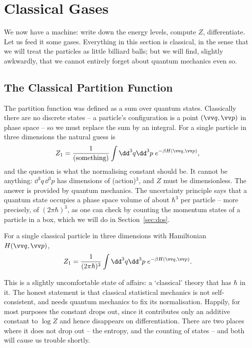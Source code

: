 \section{Classical Gases}

We now have a machine: write down the energy levels, compute $Z$, differentiate. Let us feed it some gases. Everything in this section is classical, in the sense that we will treat the particles as little billiard balls; but we will find, slightly awkwardly, that we cannot entirely forget about quantum mechanics even so.

\subsection{The Classical Partition Function}\label{sec:classicalZ}

The partition function was defined as a sum over quantum states. Classically there are no discrete states -- a particle's configuration is a point $(\vv q, \vv p)$ in phase space -- so we must replace the sum by an integral. For a single particle in three dimensions the natural guess is
$$
Z_1 = \frac{1}{(\text{something})}\int \dd^3 q \dd^3 p \; e^{-\beta H(\vv q, \vv p)},
$$
and the question is what the normalising constant should be. It cannot be anything: $\dd^3q\,\dd^3 p$ has dimensions of (action)$^3$, and $Z$ must be dimensionless. The answer is provided by quantum mechanics. The uncertainty principle says that a quantum state occupies a phase space volume of about $\hbar^3$ per particle -- more precisely, of $(2\pi\hbar)^3$, as one can check by counting the momentum states of a particle in a box, which we will do in Section~\ref{sec:dos}.

\begin{definition}
	For a single classical particle in three dimensions with Hamiltonian $H(\vv q, \vv p)$,
	$$
	Z_1 = \frac{1}{(2\pi\hbar)^3}\int \dd^3 q\dd^3 p\; e^{-\beta H(\vv q, \vv p)}.
	$$
\end{definition}

This is a slightly uncomfortable state of affairs: a `classical' theory that has $\hbar$ in it. The honest statement is that classical statistical mechanics is not self-consistent, and needs quantum mechanics to fix its normalisation. Happily, for most purposes the constant drops out, since it contributes only an additive constant to $\log Z$ and hence disappears on differentiation. There are two places where it does not drop out -- the entropy, and the counting of states -- and both will cause us trouble shortly.

